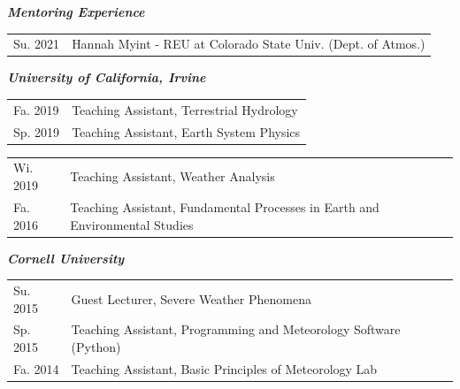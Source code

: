 \documentclass[margin,line,palatino,courier,10pt]{res}
\begin{document}
\begin{resume}
\textit{\textbf{Mentoring Experience}}
\vspace*{0.05in}\\
\begin{tabular}{@{}p{0.9in}p{4in}}
Su. 2021 & Hannah Myint - REU at Colorado State Univ. (Dept. of Atmos.)
\end{tabular}

\textit{\textbf{University of California, Irvine}}
\vspace*{0.05in}\\
\begin{tabular}{@{}p{0.9in}p{4in}}
Fa. 2019 & Teaching Assistant, Terrestrial Hydrology\\
Sp. 2019 & Teaching Assistant, Earth System Physics\\
\end{tabular}
\begin{tabular}{@{}p{0.9in}p{4in}}
Wi. 2019 & Teaching Assistant, Weather Analysis\\
Fa. 2016 & Teaching Assistant, Fundamental Processes in Earth and Environmental Studies\\
\end{tabular}

\textit{\textbf{Cornell University}}
\vspace*{0.05in}\\
\begin{tabular}{@{}p{0.9in}p{4in}}
Su. 2015 & Guest Lecturer, Severe Weather Phenomena\\
Sp. 2015 & Teaching Assistant, Programming and Meteorology Software (Python)\\
Fa. 2014 & Teaching Assistant, Basic Principles of Meteorology Lab\\
\end{tabular}


\end{resume}
\end{document}
